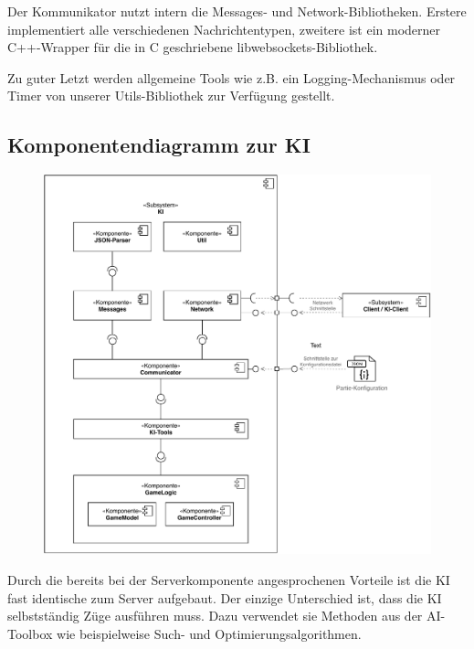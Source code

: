 Der Kommunikator nutzt intern die Messages- und Network-Bibliotheken. Erstere implementiert alle verschiedenen Nachrichtentypen, zweitere ist ein moderner C++-Wrapper für die in C geschriebene libwebsockets-Bibliothek.

Zu guter Letzt werden allgemeine Tools wie z.B. ein Logging-Mechanismus oder Timer von unserer Utils-Bibliothek zur Verfügung gestellt.

\subsection{Komponentendiagramm zur KI}
\begin{figure}[H]
    \centering
    \includegraphics[scale=0.85]{../Endabnahme/images/KiDiagramme.pdf}
\end{figure}
Durch die bereits bei der Serverkomponente angesprochenen Vorteile ist die KI fast identische zum Server aufgebaut. Der einzige Unterschied ist, dass die KI selbstständig Züge ausführen muss. Dazu verwendet sie Methoden aus der AI-Toolbox wie beispielweise Such- und Optimierungsalgorithmen.

